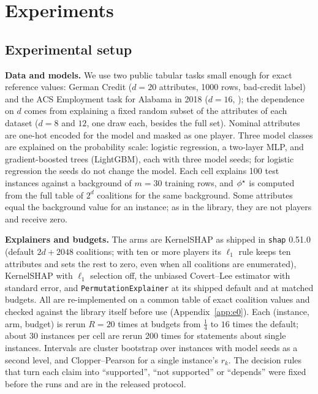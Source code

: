 \section{Experiments}
\label{sec:experiments}

\subsection{Experimental setup}
\label{sec:exp-setup}

\textbf{Data and models.}
We use two public tabular tasks small enough for exact reference values: German Credit ($d=20$ attributes, 1000 rows, bad-credit label) and the ACS Employment task for Alabama in 2018 ($d=16$, \citealt{ding2021retiring}); the dependence on $d$ comes from explaining a fixed random subset of the attributes of each dataset ($d=8$ and $12$, one draw each, besides the full set). Nominal attributes are one-hot encoded for the model and masked as one player. Three model classes are explained on the probability scale: logistic regression, a two-layer MLP, and gradient-boosted trees (LightGBM), each with three model seeds; for logistic regression the seeds do not change the model. Each cell explains 100 test instances against a background of $m=30$ training rows, and $\phi^{\star}$ is computed from the full table of $2^d$ coalitions for the same background. Some attributes equal the background value for an instance; as in the library, they are not players and receive zero.

\textbf{Explainers and budgets.}
The arms are KernelSHAP as shipped in \texttt{shap} 0.51.0 (default $2d{+}2048$ coalitions; with ten or more players its $\ell_1$ rule keeps ten attributes and sets the rest to zero, even when all coalitions are enumerated), KernelSHAP with $\ell_1$ selection off, the unbiased Covert--Lee estimator with standard error, and \texttt{PermutationExplainer} at its shipped default and at matched budgets. All are re-implemented on a common table of exact coalition values and checked against the library itself before use (Appendix~\ref{app:e0}). Each (instance, arm, budget) is rerun $R=20$ times at budgets from $\tfrac14$ to $16$ times the default; about 30 instances per cell are rerun 200 times for statements about single instances. Intervals are cluster bootstrap over instances with model seeds as a second level, and Clopper--Pearson for a single instance's $r_k$. The decision rules that turn each claim into ``supported'', ``not supported'' or ``depends'' were fixed before the runs and are in the released protocol.

